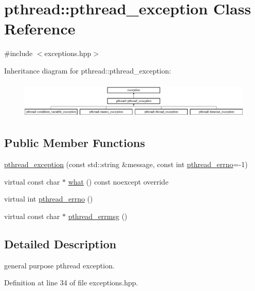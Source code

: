 \hypertarget{classpthread_1_1pthread__exception}{}\section{pthread\+:\+:pthread\+\_\+exception Class Reference}
\label{classpthread_1_1pthread__exception}


{\ttfamily \#include $<$exceptions.\+hpp$>$}

Inheritance diagram for pthread\+:\+:pthread\+\_\+exception\+:\begin{figure}[H]
\begin{center}
\leavevmode
\includegraphics[height=1.794872cm]{classpthread_1_1pthread__exception}
\end{center}
\end{figure}
\subsection*{Public Member Functions}
\begin{DoxyCompactItemize}
\item 
\hyperlink{classpthread_1_1pthread__exception_ac52d5b544f7b86bed738afd2a5f11473}{pthread\+\_\+exception} (const std\+::string \&message, const int \hyperlink{classpthread_1_1pthread__exception_a4a869173054faca1945ac1a7729082d6}{pthread\+\_\+errno}=-\/1)
\item 
virtual const char $\ast$ \hyperlink{classpthread_1_1pthread__exception_a6389bf5caec2b67fa2c9ece8e72dc162}{what} () const  noexcept override
\item 
virtual int \hyperlink{classpthread_1_1pthread__exception_a4a869173054faca1945ac1a7729082d6}{pthread\+\_\+errno} ()
\item 
virtual const char $\ast$ \hyperlink{classpthread_1_1pthread__exception_afc17488e8f6160865f1beb4d6fc20d2a}{pthread\+\_\+errmsg} ()
\end{DoxyCompactItemize}


\subsection{Detailed Description}
general purpose pthread exception. 

Definition at line 34 of file exceptions.\+hpp.



